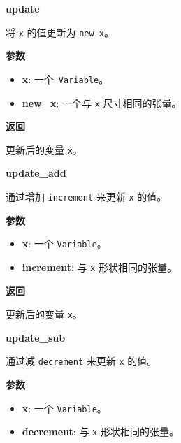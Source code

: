 \textbf{update}\label{update}

\begin{Shaded}
\begin{Highlighting}[]
\end{Highlighting}
\end{Shaded}

将 \texttt{x} 的值更新为 \texttt{new\_x}。

\textbf{参数}

\begin{itemize}
\tightlist
\item
  \textbf{x}: 一个~\texttt{Variable}。
\item
  \textbf{new\_x}: 一个与 \texttt{x} 尺寸相同的张量。
\end{itemize}

\textbf{返回}

更新后的变量 \texttt{x}。


\textbf{update\_add}\label{updateux5fadd}

\begin{Shaded}
\begin{Highlighting}[]
\end{Highlighting}
\end{Shaded}

通过增加 \texttt{increment} 来更新 \texttt{x} 的值。

\textbf{参数}

\begin{itemize}
\tightlist
\item
  \textbf{x}: 一个 \texttt{Variable}。
\item
  \textbf{increment}: 与 \texttt{x} 形状相同的张量。
\end{itemize}

\textbf{返回}

更新后的变量 \texttt{x}。


\textbf{update\_sub}\label{updateux5fsub}

\begin{Shaded}
\begin{Highlighting}[]
\end{Highlighting}
\end{Shaded}

通过减 \texttt{decrement} 来更新 \texttt{x} 的值。

\textbf{参数}

\begin{itemize}
\tightlist
\item
  \textbf{x}: 一个 \texttt{Variable}。
\item
  \textbf{decrement}: 与 \texttt{x} 形状相同的张量。
\end{itemize}

